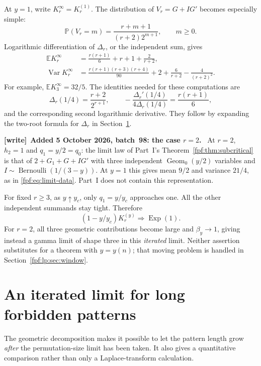 \documentclass[11pt]{article}
\numberwithin{equation}{section}
\theoremstyle{definition}
\newcommand{\E}{\mathbb E}
\newcommand{\Prob}{\mathbb P}
\newenvironment{writenote}[1][]{\par\smallskip\begingroup\small
 \noindent\textbf{[write]}\if\relax\detokenize{#1}\relax\else~\textbf{#1.}\fi\ }%
 {\par\endgroup\smallskip}
\newcommand{\Var}{\operatorname{Var}}
\newcommand{\Geom}{\operatorname{Geom}_0}
\newcommand{\Exp}{\operatorname{Exp}}
\newcommand{\Ber}{\operatorname{Bernoulli}}
\begin{document}
At \(y=1\), write \(K_r^\infty=K_r^{(1)}\). The distribution of
\(V_r=G+IG'\) becomes especially simple:
\begin{equation}\label{fpf:lp:eq:V}
 \Prob(V_r=m)=\frac{r+m+1}{(r+2)2^{m+1}},\qquad m\ge0.
\end{equation}
Logarithmic differentiation of \(\Delta_r\), or the independent sum, gives
\begin{align}
 \E K_r^\infty
  &=\frac{r(r+1)}6+r+1+\frac2{r+2},\label{fpf:lp:eq:mean-K}\\
 \Var K_r^\infty
  &=\frac{r(r+1)(r+3)(r+4)}{90}
       +2+\frac6{r+2}-\frac4{(r+2)^2}.\label{fpf:lp:eq:var-K}
\end{align}
For example, \(\E K_3^\infty=32/5\). The identities needed for these
computations are
\[
 \Delta_r(1/4)=\frac{r+2}{2^{r+1}},\qquad
 -\frac{\Delta_r'(1/4)}{4\Delta_r(1/4)}=\frac{r(r+1)}6,
\]
and the corresponding second logarithmic derivative. They follow by
expanding the two-root formula for \(\Delta_r\) in
Section~\ref{fpf:lp:sec:growing}.

\begin{writenote}[Added 5 October 2026, batch~98: the case \(r=2\)]
At \(r=2\), \(h_2=1\) and \(q_1=y/2=q_0\): the limit law of Part~I's
Theorem~\ref{fpf:thm:subcritical} is that of \(2+G_1+G+IG'\) with three
independent \(\Geom(y/2)\) variables and \(I\sim\Ber(1/(3-y))\). At
\(y=1\) this gives mean \(9/2\) and variance \(21/4\), as in
\eqref{fpf:eq:limit-data}. Part~I does not contain this representation.
\end{writenote}

For fixed \(r\ge3\), as \(y\uparrow y_c\), only \(q_1=y/y_c\)
approaches one. All the other independent summands stay tight. Therefore
\begin{equation}\label{fpf:lp:eq:sub-edge-exp}
 (1-y/y_c)K_r^{(y)}\Rightarrow\Exp(1).
\end{equation}
For \(r=2\), all three geometric contributions become large and
\(\beta_y\to1\), giving instead a gamma limit of shape three in this
\emph{iterated} limit. Neither assertion substitutes for a theorem with
\(y=y(n)\); that moving problem is handled in Section~\ref{fpf:lp:sec:window}.

\section{An iterated limit for long forbidden patterns}
\label{fpf:lp:sec:growing}

The geometric decomposition makes it possible to let the pattern length
grow \emph{after} the permutation-size limit has been taken. It also
gives a quantitative comparison rather than only a Laplace-transform
calculation.
\end{document}
